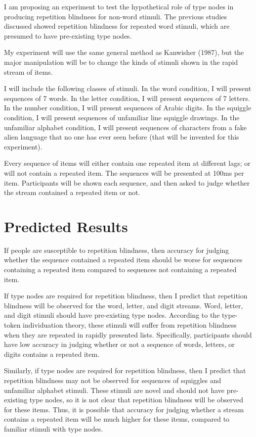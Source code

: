 \documentclass[
  man,floatsintext]{apa6}
\begin{document}
I am proposing an experiment to test the hypothetical role of type nodes in producing repetition blindness for non-word stimuli. The previous studies discussed showed repetition blindness for repeated word stimuli, which are presumed to have pre-existing type nodes.

My experiment will use the same general method as Kanwisher (1987), but the major manipulation will be to change the kinds of stimuli shown in the rapid stream of items.

I will include the following classes of stimuli. In the word condition, I will present sequences of 7 words. In the letter condition, I will present sequences of 7 letters. In the number condition, I will present sequences of Arabic digits. In the squiggle condition, I will present sequences of unfamiliar line squiggle drawings. In the unfamiliar alphabet condition, I will present sequences of characters from a fake alien language that no one has ever seen before (that will be invented for this experiment).

Every sequence of items will either contain one repeated item at different lags; or will not contain a repeated item. The sequences will be presented at 100ms per item. Participants will be shown each sequence, and then asked to judge whether the stream contained a repeated item or not.

\hypertarget{predicted-results}{%
\section{Predicted Results}\label{predicted-results}}

If people are susceptible to repetition blindness, then accuracy for judging whether the sequence contained a repeated item should be worse for sequences containing a repeated item compared to sequences not containing a repeated item.

If type nodes are required for repetition blindness, then I predict that repetition blindness will be observed for the word, letter, and digit streams. Word, letter, and digit stimuli should have pre-existing type nodes. According to the type-token individuation theory, these stimuli will suffer from repetition blindness when they are repeated in rapidly presented lists. Specifically, participants should have low accuracy in judging whether or not a sequence of words, letters, or digits contains a repeated item.

Similarly, if type nodes are required for repetition blindness, then I predict that repetition blindness may not be observed for sequences of squiggles and unfamiliar alphabet stimuli. These stimuli are novel and should not have pre-existing type nodes, so it is not clear that repetition blindness will be observed for these items. Thus, it is possible that accuracy for judging whether a stream contains a repeated item will be much higher for these items, compared to familiar stimuli with type nodes.
\end{document}
